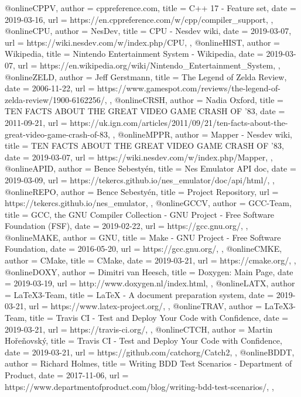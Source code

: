 @online{CPPV,
	author = {cppreference.com},
	title = {C++ 17 - Feature set},
	date = {2019-03-16},
	url = {https://en.cppreference.com/w/cpp/compiler_support},
},
@online{CPU,
	author = {NesDev},
	title = {CPU - Nesdev wiki},
	date = {2019-03-07},
	url = {https://wiki.nesdev.com/w/index.php/CPU},
},
@online{HIST,
	author = {Wikipedia},
	title = {Nintendo Entertainment System - Wikipedia},
	date = {2019-03-07},
	url = {https://en.wikipedia.org/wiki/Nintendo_Entertainment_System},
},
@online{ZELD,
	author = {Jeff Gerstmann},
	title = {The Legend of Zelda Review},
	date = {2006-11-22},
	url = {https://www.gamespot.com/reviews/the-legend-of-zelda-review/1900-6162256/},
},
@online{CRSH,
	author = {Nadia Oxford},
	title = {TEN FACTS ABOUT THE GREAT VIDEO GAME CRASH OF '83},
	date = {2011-09-21},
	url = {https://uk.ign.com/articles/2011/09/21/ten-facts-about-the-great-video-game-crash-of-83},
},
@online{MPPR,
	author = {Mapper - Nesdev wiki},
	title = {TEN FACTS ABOUT THE GREAT VIDEO GAME CRASH OF '83},
	date = {2019-03-07},
	url = {https://wiki.nesdev.com/w/index.php/Mapper},
},
@online{APID,
	author = {Bence Sebestyén},
	title = {Nes Emulator API doc},
	date = {2019-03-09},
	url = {https://tekercs.github.io/nes_emulator/doc/api/html/},
},
@online{REPO,
	author = {Bence Sebestyén},
	title = {Project Repository},
	url = {https://tekercs.github.io/nes_emulator},
},
@online{GCCV,
	author = {GCC-Team},
	title = {GCC, the GNU Compiler Collection - GNU Project - Free Software Foundation (FSF)},
	date = {2019-02-22},
	url = {https://gcc.gnu.org/},
},
@online{MAKE,
	author = {GNU},
	title = {Make - GNU Project - Free Software Foundation},
	date = {2016-05-20},
	url = {https://gcc.gnu.org/},
},
@online{CMKE,
	author = {CMake},
	title = {CMake},
	date = {2019-03-21},
	url = {https://cmake.org/},
},
@online{DOXY,
	author = {Dimitri van Heesch},
	title = {Doxygen: Main Page},
	date = {2019-03-19},
	url = {http://www.doxygen.nl/index.html},
},
@online{LATX,
	author = {LaTeX3-Team},
	title = {LaTeX - A document preparation system},
	date = {2019-03-21},
	url = {https://www.latex-project.org/},
},
@online{TRAV,
	author = {LaTeX3-Team},
	title = {Travis CI - Test and Deploy Your Code with Confidence},
	date = {2019-03-21},
	url = {https://travis-ci.org/},
},
@online{CTCH,
	author = {Martin Hořeňovský},
	title = {Travis CI - Test and Deploy Your Code with Confidence},
	date = {2019-03-21},
	url = {https://github.com/catchorg/Catch2},
},
@online{BDDT,
	author = {Richard Holmes},
	title = {Writing BDD Test Scenarios - Department of Product},
	date = {2017-11-06},
	url = {https://www.departmentofproduct.com/blog/writing-bdd-test-scenarios/},
},

